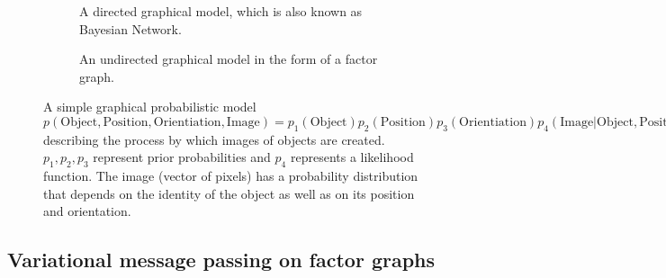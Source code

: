 \begin{figure}
  \centering
  \begin{subfigure}[t]{0.450\textwidth}
    \centering
    \resizebox{\textwidth}{!}{}
    \caption{A directed graphical model, which is also known as Bayesian Network.}
    \label{fig:intro:gm_simple}
  \end{subfigure}
  \hfill
  \begin{subfigure}[t]{0.450\textwidth}
    \centering
    \resizebox{\textwidth}{!}{}
    \caption{An undirected graphical model in the form of a factor graph.}
    \label{fig:intro:gm_fg}
  \end{subfigure}
  \caption{A simple graphical probabilistic model $p(\mathrm{Object}, \mathrm{Position}, \mathrm{Orientiation}, \mathrm{Image}) = p_1(\mathrm{Object})p_2(\mathrm{Position})p_3(\mathrm{Orientiation})p_4(\mathrm{Image}\vert\mathrm{Object}, \mathrm{Position}, \mathrm{Orientiation})$ describing the process by which images of objects are created. $p_1, p_2, p_3$ represent prior probabilities and $p_4$ represents a likelihood function. The image (vector of pixels) has a probability distribution that depends on the identity of the object as well as on its position and orientation.}
  \label{fig:intro:gm}
\end{figure}



\subsection{Variational message passing on factor graphs}

